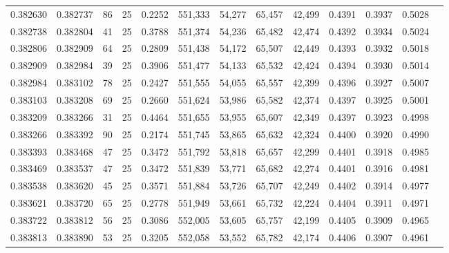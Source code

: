 \begin{tabular}{rrrrrrrrrrrrr}
0.382630 & 0.382737 &    86 &  25 &                                     0.2252 & 551,333 &  54,277 &  65,457 &  42,499 & 0.4391 & 0.3937 & 0.5028 \\
0.382738 & 0.382804 &    41 &  25 &                                     0.3788 & 551,374 &  54,236 &  65,482 &  42,474 & 0.4392 & 0.3934 & 0.5024 \\
0.382806 & 0.382909 &    64 &  25 &                                     0.2809 & 551,438 &  54,172 &  65,507 &  42,449 & 0.4393 & 0.3932 & 0.5018 \\
0.382909 & 0.382984 &    39 &  25 &                                     0.3906 & 551,477 &  54,133 &  65,532 &  42,424 & 0.4394 & 0.3930 & 0.5014 \\
0.382984 & 0.383102 &    78 &  25 &                                     0.2427 & 551,555 &  54,055 &  65,557 &  42,399 & 0.4396 & 0.3927 & 0.5007 \\
0.383103 & 0.383208 &    69 &  25 &                                     0.2660 & 551,624 &  53,986 &  65,582 &  42,374 & 0.4397 & 0.3925 & 0.5001 \\
0.383209 & 0.383266 &    31 &  25 &                                     0.4464 & 551,655 &  53,955 &  65,607 &  42,349 & 0.4397 & 0.3923 & 0.4998 \\
0.383266 & 0.383392 &    90 &  25 &                                     0.2174 & 551,745 &  53,865 &  65,632 &  42,324 & 0.4400 & 0.3920 & 0.4990 \\
0.383393 & 0.383468 &    47 &  25 &                                     0.3472 & 551,792 &  53,818 &  65,657 &  42,299 & 0.4401 & 0.3918 & 0.4985 \\
0.383469 & 0.383537 &    47 &  25 &                                     0.3472 & 551,839 &  53,771 &  65,682 &  42,274 & 0.4401 & 0.3916 & 0.4981 \\
0.383538 & 0.383620 &    45 &  25 &                                     0.3571 & 551,884 &  53,726 &  65,707 &  42,249 & 0.4402 & 0.3914 & 0.4977 \\
0.383621 & 0.383720 &    65 &  25 &                                     0.2778 & 551,949 &  53,661 &  65,732 &  42,224 & 0.4404 & 0.3911 & 0.4971 \\
0.383722 & 0.383812 &    56 &  25 &                                     0.3086 & 552,005 &  53,605 &  65,757 &  42,199 & 0.4405 & 0.3909 & 0.4965 \\
0.383813 & 0.383890 &    53 &  25 &                                     0.3205 & 552,058 &  53,552 &  65,782 &  42,174 & 0.4406 & 0.3907 & 0.4961 \\

\end{tabular}

